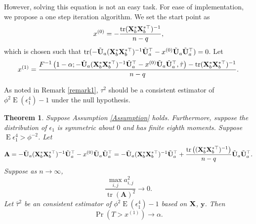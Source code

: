 \documentclass[11pt]{article}
\DeclareMathOperator{\mytr}{tr}
\DeclareMathOperator{\myE}{E}
\newcommand{\By}{\mathbf{y}}    \newcommand{\Bz}{\mathbf{z}}
\newcommand{\BA}{\mathbf{A}}    \newcommand{\BB}{\mathbf{B}}    \newcommand{\BC}{\mathbf{C}}    \newcommand{\BD}{\mathbf{D}}    \newcommand{\BE}{\mathbf{E}}    \newcommand{\BF}{\mathbf{F}}    \newcommand{\BG}{\mathbf{G}}    \newcommand{\BH}{\mathbf{H}}    \newcommand{\BI}{\mathbf{I}}    \newcommand{\BJ}{\mathbf{J}}    \newcommand{\BK}{\mathbf{K}}    \newcommand{\BL}{\mathbf{L}}
\theoremstyle{plain}
\newtheorem{theorem}{\quad\quad Theorem}
\theoremstyle{definition}
\theoremstyle{remark}
\begin{document}
However, solving this equation is not an easy task.
For ease of implementation, we propose a one step iteration algorithm.
We set the start point as
\begin{equation*}
    x^{(0)} =  -\frac{\mytr ( \BX_b^* \BX_b^{*\top} )^{-1}}{n-q},
\end{equation*}
which is chosen such that $\mytr( -\tilde{\BU}_a ( \BX_b^* \BX_b^{*\top} )^{-1} \tilde{\BU}_a^\top 
-x^{(0)}\tilde{\BU}_a \tilde{\BU}_a^\top )=0$.
Let
\begin{equation*}
    x^{(1)}= 
        \frac{
            F^{-1}\left(1-\alpha;-\tilde{\BU}_a ( \BX_b^* \BX_b^{*\top} )^{-1} \tilde{\BU}_a^\top 
                -x^{(0)}\tilde{\BU}_a \tilde{\BU}_a^\top
,\hat \tau\right)
-
   \mytr (\BX_b^* \BX_b^{*\top})^{-1} 
   }{n-q}
.
\end{equation*}

        As noted in Remark \ref{remark1}, $\tau^2$ should be a consistent estimator of $\phi^2 \myE (\epsilon_1^4)-1$ under the null hypothesis.

\begin{theorem}
    Suppose Assumption \ref{Assumption} holds.
    Furthermore,
    suppose the distribution of $\epsilon_1$ is symmetric about $0$ and has finite eighth moments.
    Suppose $\myE \epsilon_1^4> \phi^{-2}$.
Let
    \begin{equation*}
        \BA=
 -\tilde{\BU}_a ( \BX_b^* \BX_b^{*\top} )^{-1} \tilde{\BU}_a^\top 
-x^{(0)}\tilde{\BU}_a \tilde{\BU}_a^\top
        =
        -\tilde{\BU}_a (\BX_{b}^* \BX_b^{*\top})^{-1} \tilde{\BU}_a^\top 
        + \frac{\mytr\left( (\BX_b^* \BX_b^{*\top})^{-1} \right)}{n-q}\tilde{\BU}_a \tilde{\BU}_a^\top
        .
    \end{equation*}
    Suppose as $n\to \infty$,
    \begin{equation}\label{eq:jianchiCondition}
        \frac{ 
            \max_{i,j}a_{i,j}^2
    }{\mytr \left(
                \BA \right)^2}  \to 0.
    \end{equation}
        Let $\hat \tau^2$ be an consistent estimator of $\phi^2 \myE (\epsilon_1^4)-1$ based on $\mathbf{X}$, $\By$.
        Then 
    \begin{equation*}
        \Pr\left( T >
            x^{(1)}
    \right)
            \to \alpha.
    \end{equation*}
    \label{thm:criticalValue}
\end{theorem}
\end{document}
